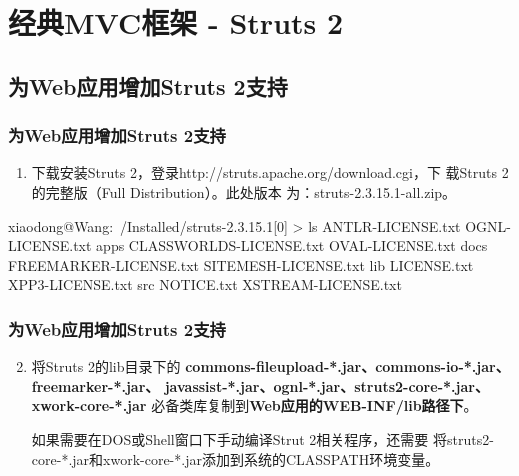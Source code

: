 \section{经典MVC框架 - Struts 2}

\subsection{为Web应用增加Struts 2支持}

\begin{frame}[fragile] %
  \frametitle{为Web应用增加Struts 2支持}
  
  \begin{enumerate}%
  \item 下载安装Struts 2，登录http://struts.apache.org/download.cgi，下
    载Struts 2的完整版（Full Distribution）。此处版本
    为：struts-2.3.15.1-all.zip。
  \end{enumerate}

  \begin{shCode}
    [18:10]xiaodong@Wang:~/Installed/struts-2.3.15.1[0]
    > ls
    ANTLR-LICENSE.txt       OGNL-LICENSE.txt        apps
    CLASSWORLDS-LICENSE.txt OVAL-LICENSE.txt        docs
    FREEMARKER-LICENSE.txt  SITEMESH-LICENSE.txt    lib
    LICENSE.txt             XPP3-LICENSE.txt        src
    NOTICE.txt              XSTREAM-LICENSE.txt
  \end{shCode}
\end{frame}

\begin{frame}[fragile] %
\frametitle{为Web应用增加Struts 2支持}
\begin{enumerate}\setcounter{enumi}{1} %
\item 将Struts 2的lib目录下的{\Red\bf
    commons-fileupload-*.jar、commons-io-*.jar、freemarker-*.jar、
    javassist-*.jar、ognl-*.jar、struts2-core-*.jar、xwork-core-*.jar}
  必备类库复制到{\bf\Red Web应用的WEB-INF/lib路径下}。

  如果需要在DOS或Shell窗口下手动编译Strut 2相关程序，还需要
  将struts2-core-*.jar和xwork-core-*.jar添加到系统的CLASSPATH环境变量。
\end{enumerate}
\end{frame}

